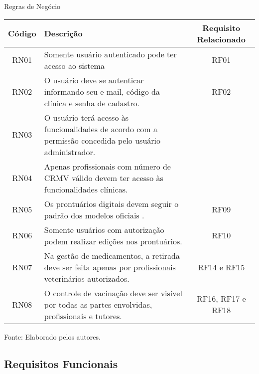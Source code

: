 \documentclass[
    12pt,               %
    openright,          %
    oneside,
    a4paper,            %
    BIBLATEX,           %
    TODO,               %
    english,            %
    brazil              %
    ]{ifsp-spo-inf-ctds}
\begin{document}
            \begin{center}
                \begin{quadro}[H]
                \caption{Regras de Negócio}
                \begin{tabulary}{1.0\textwidth}{|C|p{23em}|C|}
                \hline
                
                 Código & Descrição & Requisito Relacionado\\
                \hline
                RN01 & Somente usuário autenticado pode ter acesso ao sistema & RF01\\
                \hline
                RN02 & O usuário deve se autenticar informando seu e-mail, código da clínica e senha de cadastro. & RF02\\
                \hline
                RN03 & O usuário terá acesso às funcionalidades de acordo com a permissão concedida pelo usuário administrador. & \\
                \hline
                RN04 & Apenas profissionais com número de CRMV válido devem ter acesso às funcionalidades clínicas. & \\
                \hline
                RN05 & Os prontuários digitais devem seguir o padrão dos modelos oficiais . & RF09\\
                \hline
                RN06 & Somente usuários com autorização podem realizar edições nos prontuários. & RF10\\
                \hline
                RN07 & Na gestão de medicamentos, a retirada deve ser feita apenas por profissionais veterinários autorizados. & RF14 e RF15\\
                \hline
                RN08 & O controle de vacinação deve ser visível por todas as partes envolvidas, profissionais e tutores. & RF16, RF17 e RF18\\
                \hline
                \end{tabulary}   
                \label{tab:regra}
                \centering
                \footnotesize {Fonte: Elaborado pelos autores.}
                \end{quadro}
            \end{center}

        \subsection{Requisitos Funcionais}
        
\end{document}

